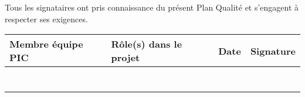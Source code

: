 Tous les signataires ont pris connaissance du présent Plan Qualité et s'engagent à respecter ses exigences. \\
	
	\vspace{1cm}

\begin{tabular}[h]{|p{}|p{}|p{}|p{}|}
	\hline
	
	\cellcolor{gray!40}Membre équipe PIC & \cellcolor{gray!40}Rôle(s) dans le projet & \cellcolor{gray!40}Date & \cellcolor{gray!40}Signature \\\hline
	\Pierre 		& \CP 				& & \\\hline
	\Francois 	& \CPA \newline \D 	& & \\\hline 
	\Kafui  		& \RQ 				& & \\\hline
	\Matthieu 	& \D \newline \RRS 	& & \\\hline
	\Florian 	& \D \newline \RS 	& & \\\hline
	\Melissa  	& \D \newline \RGC 	& & \\\hline
	\Julie 		& \D \newline \RD 	& & \\\hline
\end{tabular}



